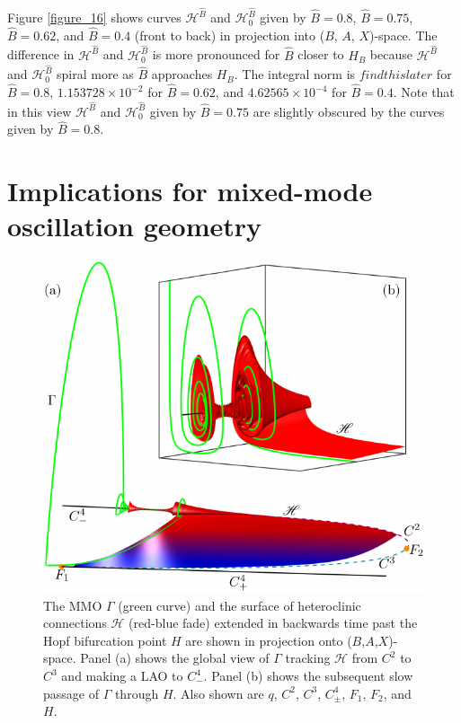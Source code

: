 \documentclass{ws-ijbc}
\begin{document}
Figure \ref{figure_16} shows curves $\mathscr{H}^{\widehat{B}}$ and $\mathscr{H}_0^{\widehat{B}}$ given by $\widehat{B}=0.8$, $\widehat{B}=0.75$, $\widehat{B}=0.62$, and $\widehat{B}=0.4$ (front to back) in projection into ($B$, $A$, $X$)-space.  The difference in $\mathscr{H}^{\widehat{B}}$ and $\mathscr{H}_0^{\widehat{B}}$ is more pronounced for $\widehat{B}$ closer to $H_B$ because $\mathscr{H}^{\widehat{B}}$ and $\mathscr{H}_0^{\widehat{B}}$ spiral more as $\widehat{B}$ approaches $H_B$.  The integral norm is $findthislater$ for $\widehat{B} = 0.8$, $1.153728 \times 10^{-2}$ for $\widehat{B} = 0.62$, and $4.62565 \times 10^{-4}$ for $\widehat{B} = 0.4$.  Note that in this view $\mathscr{H}^{\widehat{B}}$ and $\mathscr{H}_0^{\widehat{B}}$ given by $\widehat{B}=0.75$ are slightly obscured by the curves given by $\widehat{B}=0.8$.


\section{Implications for mixed-mode oscillation geometry}




\begin{figure}[H]
\centering
\includegraphics[]{./figures/MKMO_17.pdf}
\caption{The MMO $\Gamma$ (green curve) and the surface of heteroclinic connections $\mathscr{H}$ (red-blue fade) extended in backwards time past the Hopf bifurcation point $H$ are shown in projection onto ($B$,$A$,$X$)-space.  Panel (a) shows the global view of $\Gamma$ tracking $\mathscr{H}$ from $C^2$ to $C^3$ and making a LAO to $C^4_-$.  Panel (b) shows the subsequent slow passage of $\Gamma$ through $H$.  Also shown are $q$, $C^2$, $C^3$, $C^4_\pm$, $F_1$, $F_2$, and $H$.}
\label{figure_17}
\end{figure}
\end{document}
